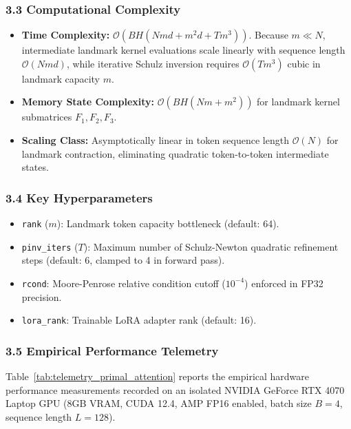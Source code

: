 \subsubsection*{3.3 Computational Complexity}
\begin{itemize}
    \item \textbf{Time Complexity:} $\mathcal{O}\left(B H (N m d + m^2 d + T m^3)\right)$. Because $m \ll N$, intermediate landmark kernel evaluations scale linearly with sequence length $\mathcal{O}(N m d)$, while iterative Schulz inversion requires $\mathcal{O}(T m^3)$ cubic in landmark capacity $m$.
    \item \textbf{Memory State Complexity:} $\mathcal{O}(B H (N m + m^2))$ for landmark kernel submatrices $F_1, F_2, F_3$.
    \item \textbf{Scaling Class:} Asymptotically linear in token sequence length $\mathcal{O}(N)$ for landmark contraction, eliminating quadratic token-to-token intermediate states.
\end{itemize}

\subsubsection*{3.4 Key Hyperparameters}
\begin{itemize}
    \item \texttt{rank} ($m$): Landmark token capacity bottleneck (default: 64).
    \item \texttt{pinv\_iters} ($T$): Maximum number of Schulz-Newton quadratic refinement steps (default: 6, clamped to 4 in forward pass).
    \item \texttt{rcond}: Moore-Penrose relative condition cutoff ($10^{-4}$) enforced in FP32 precision.
    \item \texttt{lora\_rank}: Trainable LoRA adapter rank (default: 16).
\end{itemize}

\subsubsection*{3.5 Empirical Performance Telemetry}
Table~\ref{tab:telemetry_primal_attention} reports the empirical hardware performance measurements recorded on an isolated NVIDIA GeForce RTX 4070 Laptop GPU (8GB VRAM, CUDA 12.4, AMP FP16 enabled, batch size $B=4$, sequence length $L=128$).


